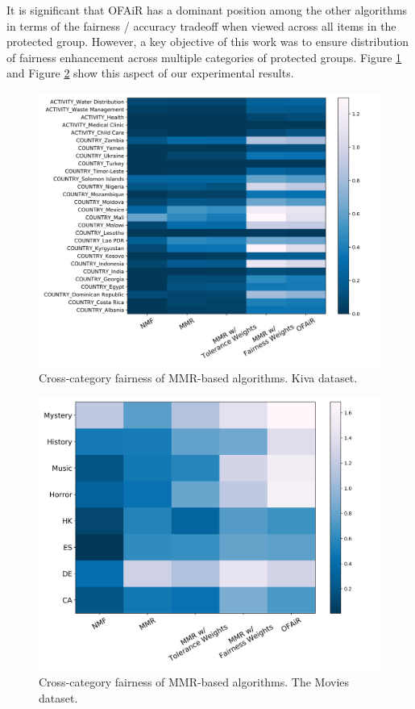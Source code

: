 It is significant that OFAiR has a dominant position among the other algorithms in terms of the fairness / accuracy tradeoff when viewed across all items in the protected group.
However, a key objective of this work was to ensure distribution of fairness enhancement across multiple categories of protected groups. Figure \ref{fig:kiva_category_heatmap} and Figure \ref{fig:ML_category_heatmap} show this aspect of our experimental results.

\begin{figure}[tbh]
    \centering
    \includegraphics[width=\linewidth]{imgs/ofair/kiva_heatmap_ActivityCountry.png}
    \caption{Cross-category fairness of MMR-based algorithms. Kiva dataset.}
    \label{fig:kiva_category_heatmap}
\end{figure}

\begin{figure}[tbh]
    \centering
    \includegraphics[width=\linewidth]{imgs/ofair/ml_heatmap_CountryGenre.png}
    \caption{Cross-category fairness of MMR-based algorithms. The Movies dataset.}
    \label{fig:ML_category_heatmap}
\end{figure}

